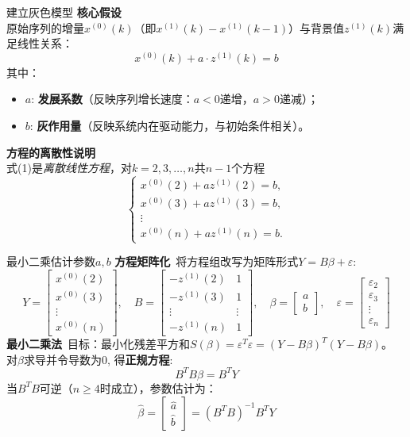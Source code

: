 \documentclass{beamer}
\begin{document}
    \begin{frame}{建立灰色模型}
    \textbf{核心假设}\\
        原始序列的增量$x^{(0)}(k)$（即$x^{(1)}(k)-x^{(1)}(k-1)$）与背景值$z^{(1)}(k)$满足线性关系：
        \[
        x^{(0)}(k) + a \cdot z^{(1)}(k) = b \tag{1}
        \]
        其中：
        \begin{itemize}
            \item $a$: \textbf{发展系数}（反映序列增长速度：$a<0$递增，$a>0$递减）；
            \item $b$: \textbf{灰作用量}（反映系统内在驱动能力，与初始条件相关）。
        \end{itemize}
    \textbf{方程的离散性说明}\\
        式(1)是\textit{离散线性方程}，对$k=2,3,\dots,n$共$n-1$个方程
        \[
        \begin{cases}
        x^{(0)}(2) + a z^{(1)}(2) = b, \\
        x^{(0)}(3) + a z^{(1)}(3) = b, \\
        \vdots \\
        x^{(0)}(n) + a z^{(1)}(n) = b.
        \end{cases}
        \]
    \end{frame}
    \begin{frame}{最小二乘估计参数$a,b$}
    \textbf{方程矩阵化} \,将方程组改写为矩阵形式$Y = B\beta + \varepsilon$: 
        \[
        Y = \begin{bmatrix} x^{(0)}(2) \\ x^{(0)}(3) \\ \vdots \\ x^{(0)}(n) \end{bmatrix}, \quad 
        B = \begin{bmatrix} -z^{(1)}(2) & 1 \\ -z^{(1)}(3) & 1 \\ \vdots & \vdots \\ -z^{(1)}(n) & 1 \end{bmatrix}, \quad 
        \beta = \begin{bmatrix} a \\ b \end{bmatrix}, \quad 
        \varepsilon = \begin{bmatrix} \varepsilon_2 \\ \varepsilon_3 \\ \vdots \\ \varepsilon_n \end{bmatrix}
        \]
\textbf{最小二乘法} \,目标：最小化残差平方和$S(\beta) = \varepsilon^T \varepsilon = (Y - B\beta)^T(Y - B\beta)$。\\
        对$\beta$求导并令导数为0, 得\textbf{正规方程}: 
        \[
        B^T B \beta = B^T Y
        \]
        当$B^T B$可逆（$n \geq 4$时成立），参数估计为：
        \[
        \hat{\beta} = \begin{bmatrix} \hat{a} \\ \hat{b} \end{bmatrix} = (B^T B)^{-1} B^T Y \tag{2}
        \]
\end{frame}
\end{document}
